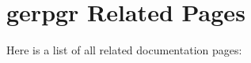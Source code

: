 \section{gerpgr Related Pages}
Here is a list of all related documentation pages:\begin{CompactList}
\item {}

\end{CompactList}
